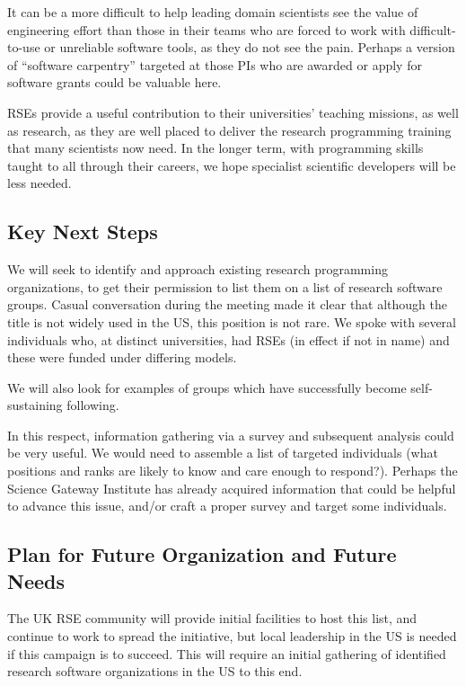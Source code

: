 It can be a more difficult to help leading domain scientists see the value of
engineering effort than those in their teams who are forced to work with
difficult-to-use or unreliable software tools, as they do not see the pain.
Perhaps a version of ``software carpentry'' targeted at those PIs who are
awarded or apply for software grants could be valuable here.

RSEs provide a useful contribution to their universities' teaching
missions, as well as research, as they are well placed to deliver the
research programming training that many scientists now need. In the longer term,
with programming skills taught to all through their careers, we hope specialist
scientific developers will be less needed.

\subsection{Key Next Steps}

We will seek to identify and approach existing research programming organizations,
to get their permission to list them on a list of research software groups.
Casual conversation during the meeting made it clear that although the title is
not widely used in the US,  this position is not rare. We spoke with several
individuals who, at distinct universities, had RSEs (in effect if not in name)
and these were funded under differing models.

We will also look for examples of groups which have successfully become self-
sustaining following. 

In this respect, information gathering via a survey and subsequent analysis could be
very useful. We would need to assemble a list of targeted individuals (what
positions and ranks are likely to know and care enough to respond?). Perhaps the
Science Gateway Institute has already acquired information that could be helpful
to advance this issue, and/or craft a proper survey and target some individuals.

\subsection{Plan for Future Organization and Future Needs}

The UK RSE community will provide initial facilities to host this list, and
continue to work to spread the initiative, but local leadership in the US is
needed if this campaign is to succeed. This will require an initial gathering of
identified research software organizations in the US to this end.

